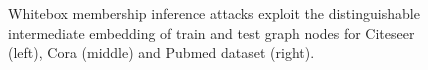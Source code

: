 \begin{figure}[!htb]
\centering
{}
\caption{Whitebox membership inference attacks exploit the distinguishable intermediate embedding of train and test graph nodes for Citeseer (left), Cora (middle) and Pubmed dataset (right).}
\label{embedding}
\vspace{-2mm}
\end{figure}



